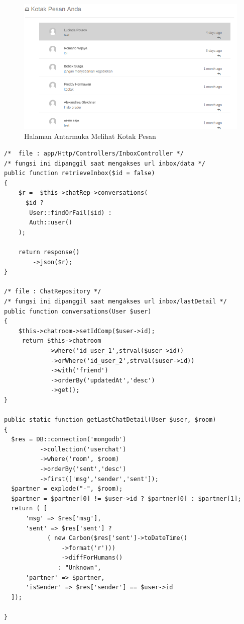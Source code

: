 \begin{figure}[H]
	\centering
	\includegraphics[width=\textwidth]{images/bab4/ui/04-05.png}
	\caption{Halaman Antarmuka Melihat Kotak Pesan}
	\label{ui.04-05}
\end{figure}
\newpage
\begin{lstlisting}[label=cdbe.04-05,style=php,caption=Implementasi \textit{Back-end} Melihat Kotak Pesan]
/*	file : app/Http/Controllers/InboxController */
/* fungsi ini dipanggil saat mengakses url inbox/data */
public function retrieveInbox($id = false)
{
    $r =  $this->chatRep->conversations(
      $id ?
       User::findOrFail($id) :
       Auth::user()
    );

    return response()
        ->json($r);
}

/* file : ChatRepository */
/* fungsi ini dipanggil saat mengakses url inbox/lastDetail */
public function conversations(User $user)
{
    $this->chatroom->setIdComp($user->id);
     return $this->chatroom
			->where('id_user_1',strval($user->id))
             ->orWhere('id_user_2',strval($user->id))
             ->with('friend')
             ->orderBy('updatedAt','desc')
             ->get();
}

public static function getLastChatDetail(User $user, $room)
{
  $res = DB::connection('mongodb')
          ->collection('userchat')
          ->where('room', $room)
          ->orderBy('sent','desc')
          ->first(['msg','sender','sent']);
  $partner = explode("-", $room);
  $partner = $partner[0] != $user->id ? $partner[0] : $partner[1];
  return ( [
      'msg' => $res['msg'],
      'sent' => $res['sent'] ?
        	( new Carbon($res['sent']->toDateTime()
	            ->format('r')))
	            ->diffForHumans() 
        	   : "Unknown",
      'partner' => $partner,
      'isSender' => $res['sender'] == $user->id
  ]);

}

\end{lstlisting}

